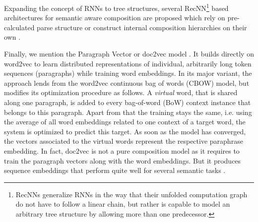 Expanding the concept of \acp{RNN} to tree structures, several \acf{RecNN}\footnote{\acp{RecNN} generalize \acp{RNN} in the way that their unfolded computation graph do not have to follow a linear chain, but rather is capable to model an arbitrary tree structure by allowing more than one predecessor.} \autocite{goller_learning_1996} based architectures for semantic aware composition are proposed which rely on pre-calculated parse structure \autocite{socher_dynamic_2011,socher_semantic_2012,socher_recursive_2013,irsoy_deep_2014,tai_improved_2015,wieting_paraphrase_2015} or construct internal composition hierarchies on their own \autocite{zhao_self-adaptive_2015,chen_sentence_2015}. 

Finally, we mention the Paragraph Vector or doc2vec model \autocite{le_distributed_2014}. It builds directly on word2vec \autocite{mikolov_distributed_2013} to learn distributed representations of individual, arbitrarily long token sequences (paragraphs) while training word embeddings. In its major variant, the approach lends from the word2vec continuous bag of words (CBOW) model, but modifies its optimization procedure as follows. A \textit{virtual} word, that is shared along one paragraph, is added to every bag-of-word (BoW) context instance that belongs to this paragraph. Apart from that the training stays the same, i.e. using the average of all word embeddings related to one context of a target word, the system is optimized to predict this target. As soon as the model has converged, the vectors associated to the virtual words represent the respective paraphrase embedding. In fact, doc2vec is not a pure composition model as it requires to train the paragraph vectors along with the word embeddings. But it produces sequence embeddings that perform quite well for several semantic tasks \autocite{lau_empirical_2016}.






